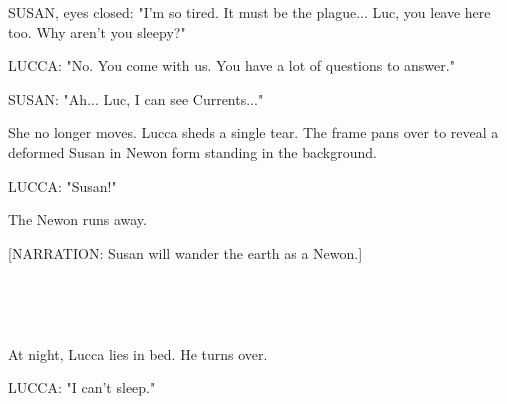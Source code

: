 \documentclass[11pt]{article}
\begin{document}
SUSAN, eyes closed: "I'm so tired.
It must be the plague...
Luc, you leave here too.
Why aren't you sleepy?"

LUCCA: "No. You come with us. 
You have a lot of questions to answer."

SUSAN: "Ah... Luc, I can see Currents..."

She no longer moves.
Lucca sheds a single tear.
The frame pans over to reveal a deformed Susan in Newon form standing in the background.

LUCCA: "Susan!"

The Newon runs away.

[NARRATION: Susan will wander the earth as a Newon.]

\ 

\ 

At night, Lucca lies in bed.
He turns over.

LUCCA: "I can't sleep."
\end{document}
